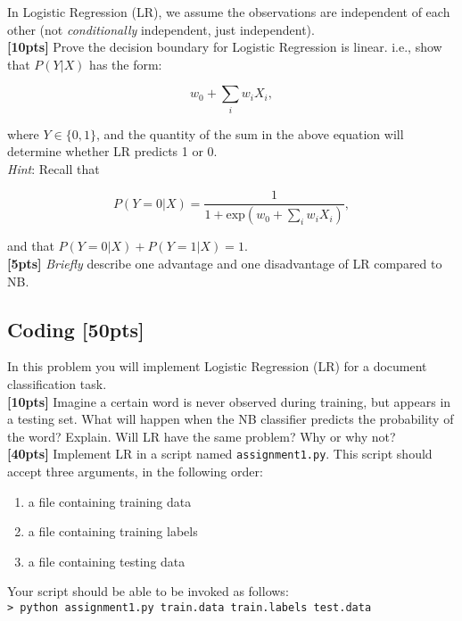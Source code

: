 \documentclass[paper=a4, fontsize=11pt]{scrartcl} %
\numberwithin{equation}{section} %
\numberwithin{figure}{section} %
\numberwithin{table}{section} %
\begin{document}
In Logistic Regression (LR), we assume the observations are independent of each other (not \emph{conditionally} independent, just independent). \\

\textbf{[10pts]} Prove the decision boundary for Logistic Regression is linear. i.e., show that $P(Y | X)$ has the form:

$$
w_0 + \sum_i w_i X_i,
$$

where $Y \in \{0, 1\}$, and the quantity of the sum in the above equation will determine whether LR predicts 1 or 0. \\

\emph{Hint}: Recall that

$$
P(Y = 0 | X) = \frac{1}{1 + \textrm{exp}(w_0 + \sum_i w_i X_i)},
$$

and that $P(Y = 0 | X) + P(Y = 1 | X) = 1$. \\

\textbf{[5pts]} \emph{Briefly} describe one advantage and one disadvantage of LR compared to NB.

\subsection{Coding \textbf{[50pts]}}

In this problem you will implement Logistic Regression (LR) for a document classification task. \\

\textbf{[10pts]} Imagine a certain word is never observed during training, but appears in a testing set. What will happen when the NB classifier predicts the probability of the word? Explain. Will LR have the same problem? Why or why not? \\

\textbf{[40pts]} Implement LR in a script named \texttt{assignment1.py}. This script should accept three arguments, in the following order: 

\begin{enumerate}
	\item a file containing training data
	\item a file containing training labels
	\item a file containing testing data
\end{enumerate}

Your script should be able to be invoked as follows: \\

\texttt{> python assignment1.py train.data train.labels test.data} \\
\end{document}
